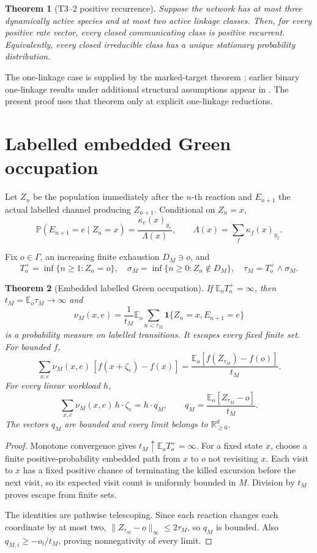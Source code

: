 \documentclass[11pt]{article}
\newtheorem{theorem}{Theorem}[section]
\newcommand{\E}{\mathbb E}
\newcommand{\Pp}{\mathbb P}
\newcommand{\one}{\mathbf 1}
\begin{document}
\begin{theorem}[T3--2 positive recurrence]\label{thm:main}
Suppose the network has at most three dynamically active species and at most
two active linkage classes.  Then, for every positive rate vector, every
closed communicating class is positive recurrent.  Equivalently, every
closed irreducible class has a unique stationary probability distribution.
\end{theorem}

The one-linkage case is supplied by the marked-target theorem
\cite{Kriebel2026Single}; earlier binary one-linkage results under additional
structural assumptions appear in \cite{AndersonCappellettiKim2020}.  The
present proof uses that theorem only at explicit one-linkage reductions.

\section{Labelled embedded Green occupation}

Let \(Z_n\) be the population immediately after the \(n\)-th reaction and
\(E_{n+1}\) the actual labelled channel producing \(Z_{n+1}\).  Conditional on
\(Z_n=x\),
\[
 \Pp(E_{n+1}=e\mid Z_n=x)
 =\frac{\kappa_e(x)_{y_e}}{\Lambda(x)},\qquad
 \Lambda(x)=\sum_f\kappa_f(x)_{y_f}.
\]

Fix \(o\in\Gamma\), an increasing finite exhaustion \(D_M\ni o\), and
\[
 T_o^+=\inf\{n\ge1:Z_n=o\},\quad
 \sigma_M=\inf\{n\ge0:Z_n\notin D_M\},\quad
 \tau_M=T_o^+\wedge\sigma_M.
\]

\begin{theorem}[Embedded labelled Green occupation]\label{thm:green}
If \(\E_oT_o^+=\infty\), then \(t_M=\E_o\tau_M\to\infty\) and
\[
 \nu_M(x,e)=\frac1{t_M}\E_o\sum_{n<\tau_M}
 \one\{Z_n=x,E_{n+1}=e\}
\]
is a probability measure on labelled transitions.  It escapes every fixed
finite set.  For bounded \(f\),
\[
 \sum_{x,e}\nu_M(x,e)\,[f(x+\zeta_e)-f(x)]
 =\frac{\E_o[f(Z_{\tau_M})-f(o)]}{t_M}.
\]
For every linear workload \(h\),
\[
 \sum_{x,e}\nu_M(x,e)\,h\!\cdot\!\zeta_e=h\!\cdot q_M,\qquad
 q_M=\frac{\E_o[Z_{\tau_M}-o]}{t_M}.
\]
The vectors \(q_M\) are bounded and every limit belongs to
\(\mathbb R_{\ge0}^d\).
\end{theorem}

\begin{proof}
Monotone convergence gives \(t_M\uparrow\E_oT_o^+=\infty\).
For a fixed state \(x\), choose a finite positive-probability embedded path
from \(x\) to \(o\) not revisiting \(x\).  Each visit to \(x\) has a fixed
positive chance of terminating the killed excursion before the next visit,
so its expected visit count is uniformly bounded in \(M\).  Division by
\(t_M\) proves escape from finite sets.

The identities are pathwise telescoping.  Since each reaction changes each
coordinate by at most two,
\(\|Z_{\tau_M}-o\|_\infty\le2\tau_M\), so \(q_M\) is bounded.  Also
\(q_{M,i}\ge-o_i/t_M\), proving nonnegativity of every limit.
\end{proof}
\end{document}

